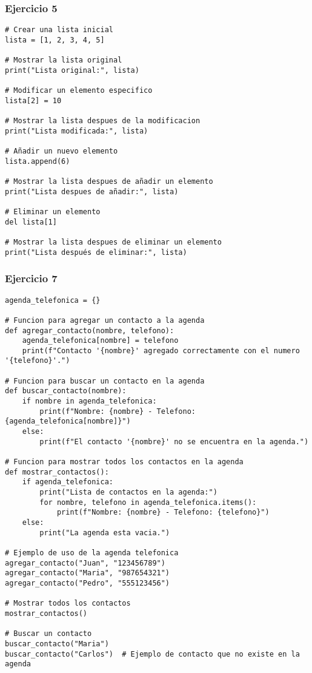 \documentclass[10pt,a4paper]{article}
\begin{document}
\subsubsection{Ejercicio 5}
\begin{lstlisting}
# Crear una lista inicial
lista = [1, 2, 3, 4, 5]

# Mostrar la lista original
print("Lista original:", lista)

# Modificar un elemento especifico
lista[2] = 10

# Mostrar la lista despues de la modificacion
print("Lista modificada:", lista)

# Añadir un nuevo elemento
lista.append(6)

# Mostrar la lista despues de añadir un elemento
print("Lista despues de añadir:", lista)

# Eliminar un elemento
del lista[1]

# Mostrar la lista despues de eliminar un elemento
print("Lista después de eliminar:", lista)

\end{lstlisting}
\newpage
\subsubsection{Ejercicio 7}
\begin{lstlisting}
agenda_telefonica = {}

# Funcion para agregar un contacto a la agenda
def agregar_contacto(nombre, telefono): 
    agenda_telefonica[nombre] = telefono 
    print(f"Contacto '{nombre}' agregado correctamente con el numero '{telefono}'.")

# Funcion para buscar un contacto en la agenda
def buscar_contacto(nombre):
    if nombre in agenda_telefonica:
        print(f"Nombre: {nombre} - Telefono: {agenda_telefonica[nombre]}")
    else:
        print(f"El contacto '{nombre}' no se encuentra en la agenda.")

# Funcion para mostrar todos los contactos en la agenda
def mostrar_contactos():
    if agenda_telefonica:
        print("Lista de contactos en la agenda:")
        for nombre, telefono in agenda_telefonica.items():
            print(f"Nombre: {nombre} - Telefono: {telefono}")
    else:
        print("La agenda esta vacia.")

# Ejemplo de uso de la agenda telefonica
agregar_contacto("Juan", "123456789")
agregar_contacto("Maria", "987654321")
agregar_contacto("Pedro", "555123456")

# Mostrar todos los contactos
mostrar_contactos()

# Buscar un contacto
buscar_contacto("Maria")
buscar_contacto("Carlos")  # Ejemplo de contacto que no existe en la agenda

\end{lstlisting}
\end{document}
